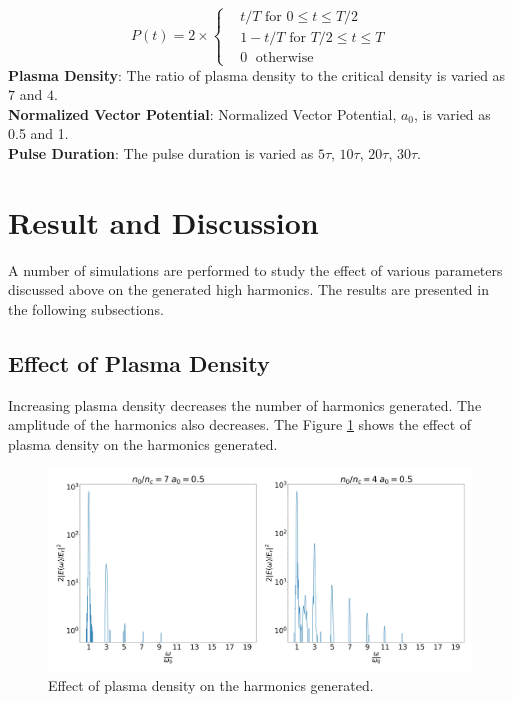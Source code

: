 \documentclass[12pt]{article}
\newenvironment{changemargin}[2]{
\begin{list}{}{
\setlength{\topsep}{0pt}
\setlength{\leftmargin}{#1}
\setlength{\rightmargin}{#2}
\setlength{\listparindent}{\parindent}
\setlength{\itemindent}{\parindent}
\setlength{\parsep}{\parskip}
}
\item[]}{\end{list}}
\begin{document}
\begin{changemargin}{-2cm}{-2cm}
\begin{equation}
        P(t)= 2\times
        \begin{cases}
             & t/T \text{ for } 0 \leq t \le T/2    \\
             & 1-t/T \text{ for } T/2 \leq t \le T  \\
             & 0         \;      \text{ otherwise }
        \end{cases}
    \end{equation}
    \noindent
    \textbf{Plasma Density}:
    The ratio of plasma density to the critical density is varied as $7$ and $4$.\\
    \noindent
    \textbf{Normalized Vector Potential}:
    Normalized Vector Potential, $a_0$, is varied as 0.5 and 1.\\
    \noindent
    \textbf{Pulse Duration}:
    The pulse duration is varied as $5\tau$, $10\tau$, $20\tau$, $30\tau$.

    \section{Result and Discussion}
    A number of simulations are performed to study the effect of various parameters discussed above on the generated high harmonics. The results are presented in the following subsections.
    \subsection{Effect of Plasma Density}
    Increasing plasma density decreases the number of harmonics generated. The amplitude of the harmonics also decreases. The Figure \ref{fig:density} shows the effect of plasma density on the harmonics generated.
    \begin{figure}[h]
        \centering
        \includegraphics[width=1.0\textwidth]{images/density.jpg}
        \caption{Effect of plasma density on the harmonics generated.}
        \label{fig:density}
    \end{figure}

\end{changemargin}
\end{document}
